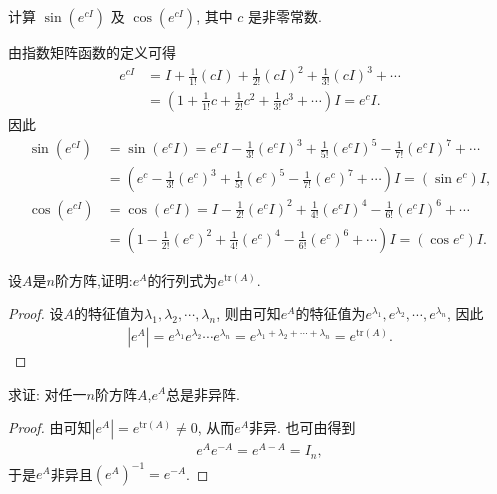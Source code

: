\documentclass[../../main.tex]{subfiles}%
\begin{document}
\begin{example}
计算 $\sin(e^{cI})$ 及 $\cos(e^{cI})$, 其中 $c$ 是非零常数.
\end{example}
\begin{solution}
由指数矩阵函数的定义可得
\begin{align*}
e^{cI}&=I+\frac{1}{1!}(cI)+\frac{1}{2!}(cI)^2+\frac{1}{3!}(cI)^3+\cdots\\
&=\left( 1+\frac{1}{1!}c+\frac{1}{2!}c^2+\frac{1}{3!}c^3+\cdots \right) I = e^cI.
\end{align*}
因此
\begin{align*}
\sin(e^{cI})&=\sin(e^cI)=e^cI-\frac{1}{3!}(e^cI)^3+\frac{1}{5!}(e^cI)^5-\frac{1}{7!}(e^cI)^7+\cdots\\
&=\left( e^c-\frac{1}{3!}(e^c)^3+\frac{1}{5!}(e^c)^5-\frac{1}{7!}(e^c)^7+\cdots \right) I = (\sin e^c)I,\\
\cos(e^{cI})&=\cos(e^cI)=I-\frac{1}{2!}(e^cI)^2+\frac{1}{4!}(e^cI)^4-\frac{1}{6!}(e^cI)^6+\cdots\\
&=\left( 1-\frac{1}{2!}(e^c)^2+\frac{1}{4!}(e^c)^4-\frac{1}{6!}(e^c)^6+\cdots \right) I = (\cos e^c)I. 
\end{align*} 

\end{solution}

\begin{proposition}\label{proposition:矩阵函数e^A的行列式}
设$A$是$n$阶方阵,证明:$e^A$的行列式为$e^{\mathrm{tr}(A)}$.
\end{proposition}
\begin{proof}
设$A$的特征值为$\lambda_1,\lambda_2,\cdots,\lambda_n$, 则由可知$e^A$的特征值为$e^{\lambda_1},e^{\lambda_2},\cdots,e^{\lambda_n}$, 因此
\begin{align*}
|e^A| = e^{\lambda_1}e^{\lambda_2}\cdots e^{\lambda_n}=e^{\lambda_1 + \lambda_2 + \cdots + \lambda_n}=e^{\mathrm{tr}(A)}.
\end{align*} 
\end{proof}

\begin{corollary}
求证: 对任一$n$阶方阵$A$,$e^A$总是非异阵.
\end{corollary}
\begin{proof}
由可知$|e^A| = e^{\mathrm{tr}(A)}\neq 0$, 从而$e^A$非异. 也可由得到
\begin{align*}
e^Ae^{-A}=e^{A - A}=I_n,
\end{align*}
于是$e^A$非异且$(e^A)^{-1}=e^{-A}$. \end{proof}
\end{document}
